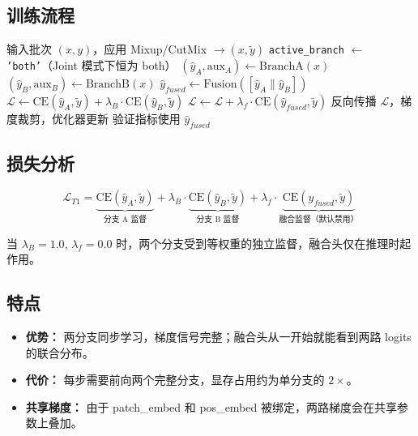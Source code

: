 \documentclass[a4paper,11pt]{article}
\begin{document}
\subsection{训练流程}

\begin{algorithm}[h]
\caption{T1 Joint 联合训练 — 单个 Step}
\begin{algorithmic}[1]
\STATE 输入批次 $(x, y)$，应用 Mixup/CutMix $\rightarrow (x, \tilde{y})$
\STATE \texttt{active\_branch} $\leftarrow$ \texttt{'both'}（Joint 模式下恒为 both）
\STATE $(\hat{y}_A, \text{aux}_A) \leftarrow \text{BranchA}(x)$
\STATE $(\hat{y}_B, \text{aux}_B) \leftarrow \text{BranchB}(x)$
\STATE $\hat{y}_{fused} \leftarrow \text{Fusion}([\hat{y}_A \| \hat{y}_B])$
\STATE $\mathcal{L} \leftarrow \text{CE}(\hat{y}_A, \tilde{y}) + \lambda_B \cdot \text{CE}(\hat{y}_B, \tilde{y})$
    \STATE $\mathcal{L} \leftarrow \mathcal{L} + \lambda_f \cdot \text{CE}(\hat{y}_{fused}, \tilde{y})$
\ENDIF
\STATE 反向传播 $\mathcal{L}$，梯度裁剪，优化器更新
\STATE 验证指标使用 $\hat{y}_{fused}$
\end{algorithmic}
\end{algorithm}

\subsection{损失分析}

\[
    \mathcal{L}_{T1} = \underbrace{\text{CE}(\hat{y}_A, \tilde{y})}_{\text{分支 A 监督}} + \lambda_B \cdot \underbrace{\text{CE}(\hat{y}_B, \tilde{y})}_{\text{分支 B 监督}} + \lambda_f \cdot \underbrace{\text{CE}(\hat{y}_{fused}, \tilde{y})}_{\text{融合监督（默认禁用）}}
\]

当 $\lambda_B=1.0$, $\lambda_f=0.0$ 时，两个分支受到等权重的独立监督，融合头仅在推理时起作用。

\subsection{特点}

\begin{itemize}
    \item \textbf{优势：} 两分支同步学习，梯度信号完整；融合头从一开始就能看到两路 logits 的联合分布。
    \item \textbf{代价：} 每步需要前向两个完整分支，显存占用约为单分支的 $2\times$。
    \item \textbf{共享梯度：} 由于 patch\_embed 和 pos\_embed 被绑定，两路梯度会在共享参数上叠加。
\end{itemize}
\end{document}
